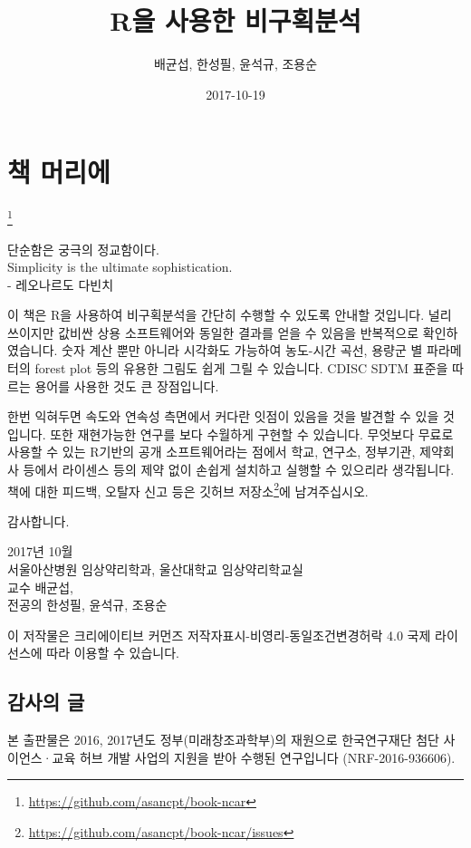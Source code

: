 \documentclass[]{krantz}
\title{R을 사용한 비구획분석}
\author{배균섭, 한성필, 윤석규, 조용순}
\date{2017-10-19}
\let\rmarkdownfootnote\footnote%
\def\footnote{\protect\rmarkdownfootnote}
\renewenvironment{quote}{\begin{VF}}{\end{VF}}
\renewcommand{\href}[2]{#2\footnote{\url{#1}}}
\theoremstyle{definition}
\theoremstyle{definition}
\theoremstyle{definition}
\theoremstyle{remark}
\begin{document}
\maketitle

{
\setcounter{tocdepth}{2}
\tableofcontents
}
\section*{책 머리에}\label{-}

\href{https://github.com/asancpt/book-ncar}{}

\begin{quote}
단순함은 궁극의 정교함이다.\\
Simplicity is the ultimate sophistication.\\
- 레오나르도 다빈치
\end{quote}

이 책은 R을 사용하여 비구획분석을 간단히 수행할 수 있도록 안내할
것입니다. 널리 쓰이지만 값비싼 상용 소프트웨어와 동일한 결과를 얻을 수
있음을 반복적으로 확인하였습니다. 숫자 계산 뿐만 아니라 시각화도
가능하여 농도-시간 곡선, 용량군 별 파라메터의 forest plot 등의 유용한
그림도 쉽게 그릴 수 있습니다. CDISC SDTM 표준을 따르는 용어를 사용한
것도 큰 장점입니다.

한번 익혀두면 속도와 연속성 측면에서 커다란 잇점이 있음을 것을 발견할 수
있을 것입니다. 또한 재현가능한 연구를 보다 수월하게 구현할 수 있습니다.
무엇보다 무료로 사용할 수 있는 R기반의 공개 소프트웨어라는 점에서 학교,
연구소, 정부기관, 제약회사 등에서 라이센스 등의 제약 없이 손쉽게
설치하고 실행할 수 있으리라 생각됩니다. 책에 대한 피드백, 오탈자 신고
등은 \href{https://github.com/asancpt/book-ncar/issues}{깃허브 저장소}에
남겨주십시오.

감사합니다.

2017년 10월\\
서울아산병원 임상약리학과, 울산대학교 임상약리학교실\\
교수 배균섭,\\
전공의 한성필, 윤석규, 조용순

이 저작물은 크리에이티브 커먼즈 저작자표시-비영리-동일조건변경허락 4.0
국제 라이선스에 따라 이용할 수 있습니다.

\subsection*{감사의 글}\label{-}

본 출판물은 2016, 2017년도 정부(미래창조과학부)의 재원으로 한국연구재단
첨단 사이언스·교육 허브 개발 사업의 지원을 받아 수행된 연구입니다
(NRF-2016-936606).
\end{document}
